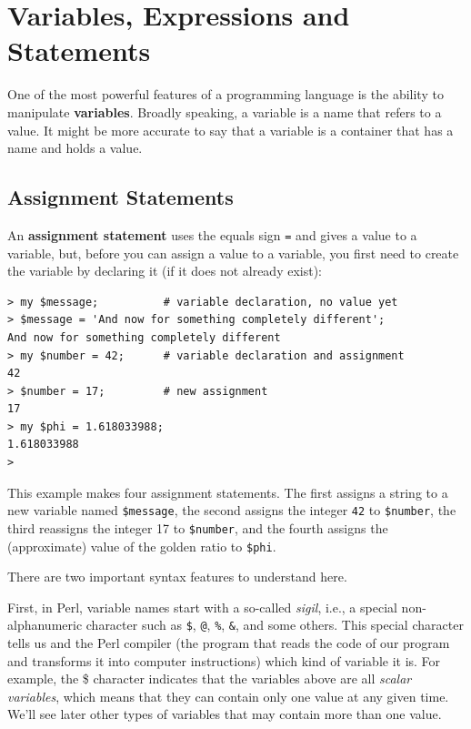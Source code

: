 \chapter{Variables, Expressions and Statements}

One of the most powerful features of a programming language 
is the ability to manipulate {\bf variables}.  Broadly 
speaking, a variable is a name that refers to a value. It 
might be more accurate to say that a variable is a container 
that has a name and holds a value.


\section{Assignment Statements}
\label{variables}

An {\bf assignment statement} uses the equals sign {\tt =} 
and  gives a value to a variable, but, before you can assign 
a value to a variable, you first need to create the 
variable by declaring it (if it does not already 
exist):

\begin{verbatim}
> my $message;          # variable declaration, no value yet
> $message = 'And now for something completely different';
And now for something completely different
> my $number = 42;      # variable declaration and assignment
42
> $number = 17;         # new assignment
17
> my $phi = 1.618033988;
1.618033988
>
\end{verbatim}
%

This example makes four assignment statements.  The first 
assigns a string to a new variable named {\tt \$message}, 
the second assigns the integer {\tt 42} to {\tt \$number}, the 
third reassigns the integer 17 to {\tt \$number}, and the fourth 
assigns the (approximate) value of the golden ratio to {\tt \$phi}.

There are two important syntax features to understand here.

First, in Perl, variable names start with a so-called 
\emph{sigil}, i.e., a special non-alphanumeric character such 
as \verb'$', \verb'@', \verb'%', \verb'&', and some others. 
This special character 
tells us and the Perl compiler (the program that reads 
the code of our program and transforms it into computer 
instructions) which kind of variable it is. For example, the 
\$ character indicates that the variables above are all 
\emph{scalar variables}, which means that they can contain 
only one value at any given time. We'll see later other 
types of variables that may contain more than one value.

